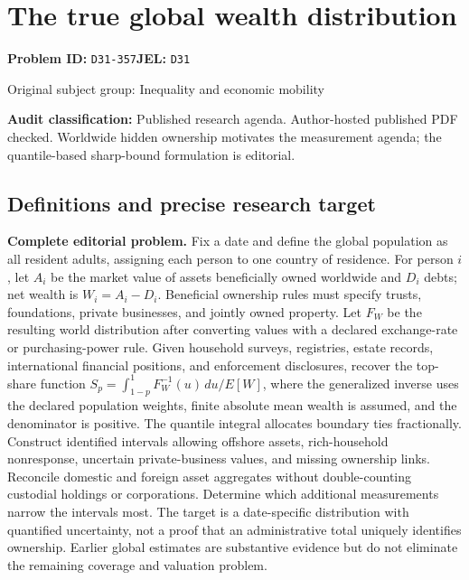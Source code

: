 \documentclass[11pt,a4paper]{article}
\begin{document}
\section*{The true global wealth distribution}
\textbf{Problem ID:} \texttt{D31-357}\quad \textbf{JEL:} \texttt{D31}\par
\label{problem:OP-0361}
{\sffamily\small\color{muted}Original subject group: Inequality and economic mobility\par}
\label{definitions:problem:30007643}
\textbf{Audit classification:} Published research agenda. Author-hosted published PDF checked. Worldwide hidden ownership motivates the measurement agenda; the quantile-based sharp-bound formulation is editorial.
\subsection*{Definitions and precise research target}
\textbf{Complete editorial problem.} Fix a date and define the global population as all resident adults, assigning each person to one country of residence. For person \(i\), let \(A_i\) be the market value of assets beneficially owned worldwide and \(D_i\) debts; net wealth is \(W_i=A_i-D_i\). Beneficial ownership rules must specify trusts, foundations, private businesses, and jointly owned property. Let \(F_W\) be the resulting world distribution after converting values with a declared exchange-rate or purchasing-power rule. Given household surveys, registries, estate records, international financial positions, and enforcement disclosures, recover the top-share function \(S_p=\int_{1-p}^{1}F_W^{-1}(u)\,du/E[W]\), where the generalized inverse uses the declared population weights, finite absolute mean wealth is assumed, and the denominator is positive. The quantile integral allocates boundary ties fractionally. Construct identified intervals allowing offshore assets, rich-household nonresponse, uncertain private-business values, and missing ownership links. Reconcile domestic and foreign asset aggregates without double-counting custodial holdings or corporations. Determine which additional measurements narrow the intervals most. The target is a date-specific distribution with quantified uncertainty, not a proof that an administrative total uniquely identifies ownership. Earlier global estimates are substantive evidence but do not eliminate the remaining coverage and valuation problem.
\end{document}
